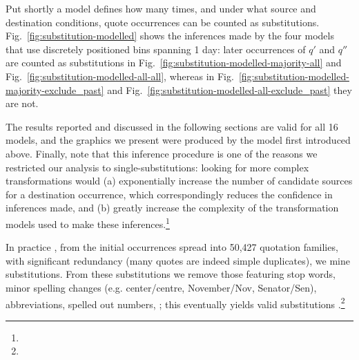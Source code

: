\begin{new}

Put shortly a model defines how many times, and under what source and destination conditions, quote occurrences can be counted as substitutions.
Fig.~\ref{fig:substitution-modelled} shows the inferences made by the four models that use discretely positioned bins spanning 1 day:
later occurrences of $q'$ and $q''$ are counted as substitutions in Fig.~\ref{fig:substitution-modelled-majority-all} and Fig.~\ref{fig:substitution-modelled-all-all}, whereas in Fig.~\ref{fig:substitution-modelled-majority-exclude_past} and Fig.~\ref{fig:substitution-modelled-all-exclude_past} they are not.

The results reported and discussed in the following sections are valid for all 16 models, and the graphics we present were produced by the model first introduced above.
Finally, note that this inference procedure is one of the reasons we restricted our analysis to single-substitutions:
looking for more complex transformations would
(a) exponentially increase the number of candidate sources for a destination occurrence, which correspondingly reduces the confidence in inferences made,
and (b) greatly increase the complexity of the transformation models used to make these inferences.\footnote{
}

\end{new}

\medskip

In practice , from the  initial occurrences spread into 50,427 quotation families, with significant redundancy (many quotes are indeed simple duplicates), we mine  substitutions.
From these substitutions we remove those featuring stop words, minor spelling changes (e.g. center/centre, November/Nov, Senator/Sen), abbreviations, spelled out numbers, ;
this eventually yields  valid substitutions .\footnote{
}

